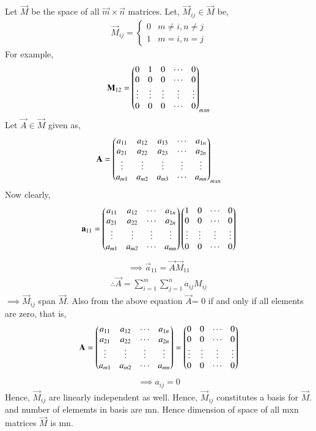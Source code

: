 Let $\vec{M}$ be the space of all $\vec{m}\times\vec{n}$ matrices. Let, $\vec{M}_{ij} \in \vec{M}$ be,
\begin{align}
\vec{M}_{ij} = \begin{cases} 0 &  m\neq i, n\neq j \\ 1 & m=i,n=j \end{cases}
\end{align}
For example,
\begin{align}
\mathbf{M}_{12} = \begin{pmatrix}0&1&0&\cdots&0\\0&0&0&\cdots&0\\\vdots&\vdots&\vdots&\vdots&\vdots\\0&0&0&\cdots&0\end{pmatrix}_{mxn}\\
\end{align}
Let $\vec{A} \in \vec{M}$ given as,
\begin{align}
\mathbf{A} = \begin{pmatrix}a_{11}&a_{12}&a_{13}&\cdots&a_{1n}\\a_{21}&a_{22}&a_{23}&\cdots&a_{2n}\\\vdots&\vdots&\vdots&\vdots&\vdots\\a_{m1}&a_{m2}&a_{m3}&\cdots&a_{mn}\end{pmatrix}_{mxn}
\end{align}
Now clearly,
\begin{align}
\mathbf{a}_{11} = \begin{pmatrix}a_{11}&a_{12}&\cdots&a_{1n}\\a_{21}&a_{22}&\cdots&a_{2n}\\\vdots&\vdots&\vdots&\vdots\\a_{m1}&a_{m2}&\cdots&a_{mn}\end{pmatrix} \begin{pmatrix}1&0&\cdots&0\\0&0&\cdots&0\\\vdots&\vdots&\vdots&\vdots\\0&0&\cdots&0\end{pmatrix}
\end{align}
\begin{align}
\implies \vec{a}_{11} = \vec{A}\vec{M}_{11}
\end{align}
\begin{align}
\therefore\vec{A} = \sum_{i=1}^{m} \sum_{j=1}^{n} a_{ij}M_{ij} 
\end{align}
$\implies \vec{M}_{ij}$ span $\vec{M}$. 
Also from the above equation 
$\vec{A}$=  0 if and only if all elements are zero, that is, 
\begin{align}
\mathbf{A} = \begin{pmatrix}a_{11}&a_{12}&\cdots&a_{1n}\\a_{21}&a_{22}&\cdots&a_{2n}\\\vdots&\vdots&\vdots&\vdots\\a_{m1}&a_{m2}&\cdots&a_{mn}\end{pmatrix}= \begin{pmatrix}0&0&\cdots&0\\0&0&\cdots&0\\\vdots&\vdots&\vdots&\vdots\\0&0&\cdots&0\end{pmatrix}
\end{align}
\begin{align}
\implies a_{ij} = 0
\end{align}
Hence, $\vec{M}_{ij}$ are linearly independent as well. Hence, $\vec{M}_{ij}$ constitutes a basis for $\vec{M}$. and number of elememts in basis are mn. Hence dimension of space of all mxn matrices $\vec{M}$ is mn. 
